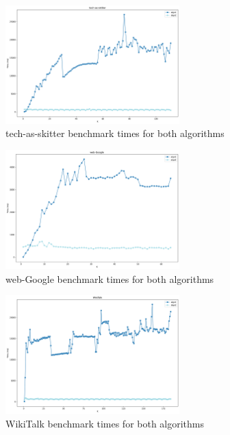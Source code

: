 \begin{figure}[H]
    \centering
    \includegraphics[width=0.6\textwidth]{Figures/tech-as-skitter.png}
    \caption{tech-as-skitter benchmark times for both algorithms}
    \label{fig:tech-as-skitter}
\end{figure}

\begin{figure}[H]
    \centering
    \includegraphics[width=0.6\textwidth]{Figures/web-Google.png}
    \caption{web-Google benchmark times for both algorithms}
    \label{fig:web-google}
\end{figure}

\begin{figure}[H]
    \centering
    \includegraphics[width=0.6\textwidth]{Figures/WikiTalk.png}
    \caption{WikiTalk benchmark times for both algorithms}
    \label{fig:wikitalk}
\end{figure} 

